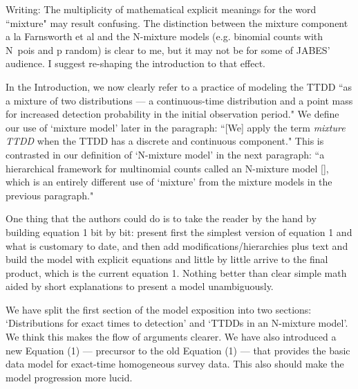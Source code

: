 \documentclass[12pt]{article}
\renewenvironment{quote}  %
              {\list{}{\rightmargin\leftmargin}\normalfont%
               \item\relax}
              {\endlist}
\begin{document}
Writing: The multiplicity of mathematical explicit meanings for the word ``mixture" may result confusing. The distinction between the mixture component a la Farnsworth et al and the N-mixture models (e.g. binomial counts with N~pois and p random) is clear to me, but it may not be for some of JABES' audience.  I suggest re-shaping the introduction to that effect. 
\begin{quote}
In the Introduction, we now clearly refer to a practice of modeling the TTDD ``as a mixture of two distributions --- a continuous-time distribution and a point mass for increased detection probability in the initial observation period."
We define our use of `mixture model' later in the paragraph:  ``[We] apply the term \emph{mixture TTDD} when the TTDD has a discrete and continuous component."
This is contrasted in our definition of `N-mixture model' in the next paragraph: ``a hierarchical framework for multinomial counts called an N-mixture model \mbox{[\dotso]}, which is an entirely different use of `mixture' from the mixture models in the previous paragraph."
\end{quote}

One thing that the authors could do is to take the reader by the hand by building equation 1 bit by bit: present first the simplest version of equation 1 and what is customary to date, and then add modifications/hierarchies plus text and build the model with explicit equations and little by little arrive to the final product, which is the current equation 1. Nothing better than clear simple math aided by short explanations to present a model unambiguously.
\begin{quote}
We have split the first section of the model exposition into two sections: `Distributions for exact times to detection' and `TTDDs in an N-mixture model'.
We think this makes the flow of arguments clearer.
We have also introduced a new Equation (1) --- precursor to the old Equation (1) --- that provides the basic data model for exact-time homogeneous survey data.
This also should make the model progression more lucid.
\end{quote}
\end{document}
